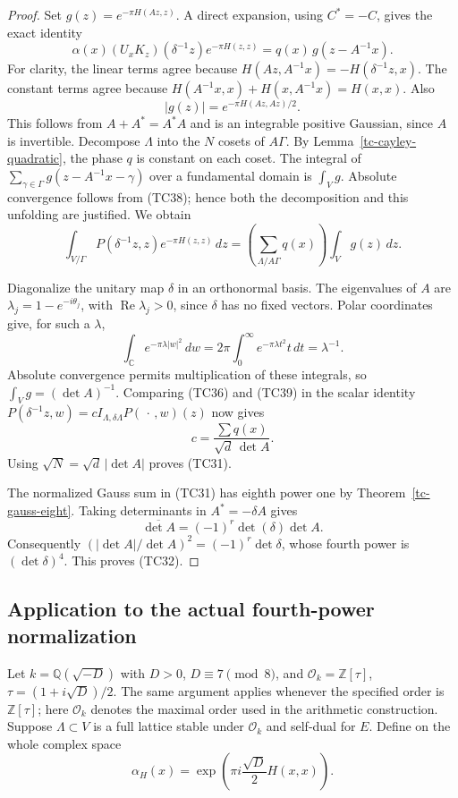 \begin{proof}
Set $g(z)=e^{-\pi H(Az,z)}$.
A direct expansion, using $C^*=-C$, gives the exact identity
\[
 \alpha(x)(U_xK_z)(\delta^{-1}z)e^{-\pi H(z,z)}
                  =q(x)\,g(z-A^{-1}x).
 \tag{TC37}
\]
For clarity, the linear terms agree because
$H(Az,A^{-1}x)=-H(\delta^{-1}z,x)$.
The constant terms agree because
$H(A^{-1}x,x)+H(x,A^{-1}x)=H(x,x)$.
Also
\[
                 |g(z)|=e^{-\pi H(Az,Az)/2}.
 \tag{TC38}
\]
This follows from $A+A^*=A^*A$ and is an integrable
positive Gaussian, since $A$ is invertible.
Decompose $\Lambda$ into the $N$ cosets of $A\Gamma$.
By Lemma~\ref{tc-cayley-quadratic}, the phase $q$ is constant
on each coset.  The integral of
$\sum_{\gamma\in\Gamma}g(z-A^{-1}x-\gamma)$ over
a fundamental domain is $\int_Vg$.
Absolute convergence follows from (TC38); hence both the
decomposition and this unfolding are justified.
We obtain
\[
 \int_{V/\Gamma}P(\delta^{-1}z,z)e^{-\pi H(z,z)}\,dz
       =\left(\sum_{\Lambda/A\Gamma}q(x)\right)\int_Vg(z)\,dz.
 \tag{TC39}
\]

Diagonalize the unitary map $\delta$ in an orthonormal basis.
The eigenvalues of $A$ are $\lambda_j=1-e^{-i\theta_j}$,
with $\operatorname{Re}\lambda_j>0$, since $\delta$ has no
fixed vectors.  Polar coordinates give, for such a $\lambda$,
\[
 \int_{\mathbb C}e^{-\pi\lambda|w|^2}\,dw
        =2\pi\int_0^\infty e^{-\pi\lambda t^2}t\,dt
        =\lambda^{-1}.
\]
Absolute convergence permits multiplication of these integrals,
so $\int_Vg=(\det A)^{-1}$.
Comparing (TC36) and (TC39) in the scalar identity
$P(\delta^{-1}z,w)=cI_{\Lambda,\delta\Lambda}P(\,\cdot\,,w)(z)$
now gives
\[
                c=\frac{\sum q(x)}{\sqrt d\,\det A}.
\]
Using $\sqrt N=\sqrt d\,|\det A|$ proves (TC31).

The normalized Gauss sum in (TC31) has eighth power one
by Theorem~\ref{tc-gauss-eight}.
Taking determinants in $A^*=-\delta A$ gives
\[
             \overline{\det A}=(-1)^r\det(\delta)\det A.
 \tag{TC40}
\]
Consequently $(|\det A|/\det A)^2=(-1)^r\det\delta$,
whose fourth power is $(\det\delta)^4$.
This proves (TC32).
\end{proof}

\subsection{Application to the actual fourth-power normalization}

Let $k=\mathbb Q(\sqrt{-D})$ with $D>0$, $D\equiv7\pmod8$,
and $\mathcal O_k=\mathbb Z[\tau]$,
$\tau=(1+i\sqrt D)/2$.
The same argument applies whenever the specified order is
$\mathbb Z[\tau]$; here $\mathcal O_k$ denotes the maximal
order used in the arithmetic construction.
Suppose $\Lambda\subset V$ is a full lattice stable under
$\mathcal O_k$ and self-dual for $E$.
Define on the whole complex space
\[
              \alpha_H(x)=
                    \exp\!\left(\pi i\frac{\sqrt D}{2}H(x,x)\right).
 \tag{TC41}
\]

